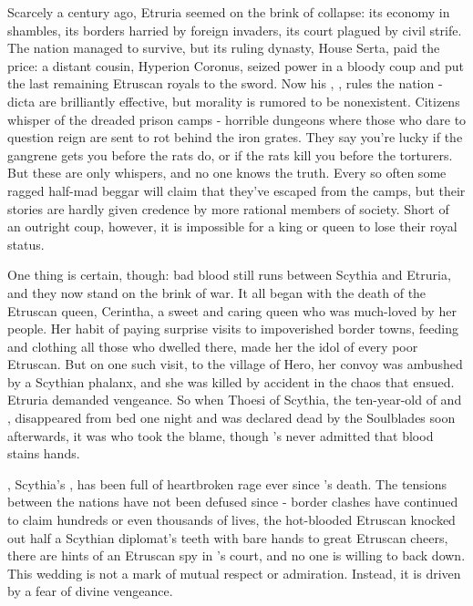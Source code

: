 \documentclass[blue]{Kos}
\begin{document}
Scarcely a century ago, Etruria seemed on the brink of collapse: its economy in shambles, its borders harried by foreign invaders, its court plagued by civil strife. The nation managed to survive, but its ruling dynasty, House Serta, paid the price: a distant cousin, Hyperion Coronus, seized power in a bloody coup and put the last remaining Etruscan royals to the sword. Now his \cEtruriaKing{\offspring}, \cEtruriaKing{}, rules the nation - \cEtruriaKing{\their} dicta are brilliantly effective, but \cEtruriaKing{\their} morality is rumored to be nonexistent. Citizens whisper of the dreaded prison camps - horrible dungeons where those who dare to question \cEtruriaKing{\their} reign are sent to rot behind the iron grates. They say you're lucky if the gangrene gets you before the rats do, or if the rats kill you before the torturers. But these are only whispers, and no one knows the truth. Every so often some ragged half-mad beggar will claim that they've escaped from the camps, but their stories are hardly given credence by more rational members of society. Short of an outright coup, however, it is impossible for a king or queen to lose their royal status.

One thing is certain, though: bad blood still runs between Scythia and Etruria, and they now stand on the brink of war. It all began with the death of the Etruscan queen, Cerintha, a sweet and caring queen who was much-loved by her people. Her habit of paying surprise visits to impoverished border towns, feeding and clothing all those who dwelled there, made her the idol of every poor Etruscan. But on one such visit, to the village of Hero, her convoy was ambushed by a Scythian phalanx, and she was killed by accident in the chaos that ensued. Etruria demanded vengeance. So when \cFugitive{\Prince} Thoesi of Scythia, the ten-year-old \cFugitive{\offspring} of \cScythiaKing{\Monarch} \cScythiaKing{} and \cScythiaQueen{\Monarch} \cScythiaQueen{}, disappeared from \cFugitive{\their} bed one night and was declared dead by the Soulblades soon afterwards, it was \cEtruriaKing{} who took the blame, though \cEtruriaKing{\they}’s never admitted that \cFugitive{\their} blood stains \cEtruriaKing{\their} hands.

\cScythiaQueen{}, Scythia's \cScythiaQueen{\monarch}, has been full of heartbroken rage ever since \cScythiaQueen{\their} \cFugitive{\offspring}'s death. The tensions between the nations have not been defused since - border clashes have continued to claim hundreds or even thousands of lives, the hot-blooded Etruscan \cPoet{\prince} \cPoet{} knocked out half a Scythian diplomat's teeth with \cPoet{\their} bare hands to great Etruscan cheers, there are hints of an Etruscan spy in \cScythiaKing{\Monarch} \cScythiaKing{}'s court, and no one is willing to back down. This wedding is not a mark of mutual respect or admiration. Instead, it is driven by a fear of divine vengeance.
\end{document}
